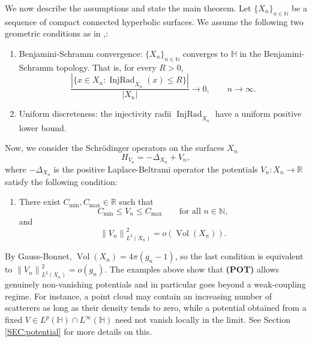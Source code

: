 \documentclass[11pt,twoside,reqno]{amsart}
\newcommand{\R}{\mathbb{R}}
\newcommand{\N}{\mathbb{N}}
\newcommand{\bH}{\mathbb{H}}
\newcommand{\1}{\mathrm{\mathbf{1}}}
\DeclareMathOperator{\Vol}{Vol}
\DeclareMathOperator{\InjRad}{InjRad}
\newcommand{\norm}[1]{\left\lVert#1\right\rVert}
\numberwithin{equation}{section}
\theoremstyle{plain}
\theoremstyle{definition}
\theoremstyle{remark}
\begin{document}
We now describe the assumptions and state the main theorem. Let $\{X_n\}_{n\in\N}$ be a sequence of compact connected hyperbolic surfaces. We assume the following two geometric conditions as in \cite{lemassonQuantumErgodicityBenjaminiSchramm2017,Hippi,lemassonQuantumErgodicityEisenstein2024,abertEigenfunctionsRandomWaves2018,AnantharamanSaha,peterson2023quantumergodicitybruhattitsbuilding,brumley2020quantumergodicitycompactquotients,brumley2026quantumergodicitybenjaminischrammlimit,Gavelli2026},:
\begin{enumerate}[label={ABC}]
    \item[\textbf{(BSC)}:] Benjamini-Schramm convergence: $\{X_n\}_{n\in\N}$ converges to $\mathbb H$ in the Benjamini-Schramm topology. That is, for every $R>0$,
    \[
        \frac{|\{x\in X_n:\InjRad_{X_n}(x)\leq R\}|}{|X_n|}
        \longrightarrow 0,
        \qquad n\to\infty.
    \]

    \item[\textbf{(UND)}:] Uniform discreteness: the injectivity radii $\InjRad_{X_n}$ have a uniform positive lower bound.
\end{enumerate}

Now, we consider the Schr\"odinger operators on the surfaces $X_n$
\[
    H_{V_n}=-\Delta_{X_n}+V_n,
\]
where $-\Delta_{X_n}$ is the positive Laplace-Beltrami operator the potentials $V_n : X_n \to \mathbb R$ satisfy the following condition:
\begin{enumerate}[label={ABC}]
    \item[\textbf{(POT)}:] There exist $C_{\min},C_{\max}\in\R$ such that
    \[
        C_{\min}\leq V_n\leq C_{\max}
        \qquad\text{for all }n\in\N,
    \]
    and
    \[
        \norm{V_n}_{L^2(X_n)}^2=o(\Vol(X_n)).
    \]
\end{enumerate}

By Gauss-Bonnet, $\Vol(X_n)=4\pi(g_n-1)$, so the last condition is equivalent to $\norm{V_n}_{L^2(X_n)}^2=o(g_n)$. The examples above show that \textbf{(POT)} allows genuinely non-vanishing potentials and in particular goes beyond a weak-coupling regime. For instance, a point cloud may contain an increasing number of scatterers as long as their density tends to zero, while a potential obtained from a fixed $V\in L^p(\bH)\cap L^\infty(\bH)$ need not vanish locally in the limit. See Section \ref{SEC:potential} for more details on this.
\end{document}
